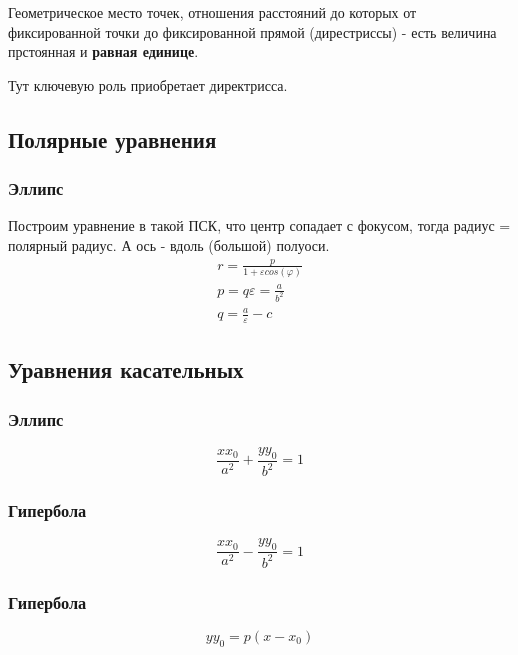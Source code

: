 \documentclass[12pt, a4paper]{article}
\begin{document}
    \begin{definition}
        [Парабола]
        Геометрическое место точек, 
        отношения расстояний до которых от фиксированной точки 
        до фиксированной прямой (дирестриссы) - 
        есть величина прстоянная и \textbf{равная единице}.
    \end{definition}

    Тут ключевую роль приобретает директрисса.

    \subsection{Полярные уравнения}

    \subsubsection{Эллипс}
    Построим уравнение в такой ПСК, что центр сопадает с фокусом, тогда радиус = полярный радиус.
    А ось - вдоль (большой) полуоси.
    \begin{gather}
        r = \frac{p}{1 + \varepsilon cos(\varphi)} \\
        p = q\varepsilon = \frac{a}{b^2} \\
        q = \frac{a}{\varepsilon} - c
    \end{gather}

    \subsection{Уравнения касательных}

    \subsubsection{Эллипс}
    \begin{equation}
        \frac{xx_0}{a^2} + \frac{yy_0}{b^2} = 1
    \end{equation}

    \subsubsection{Гипербола}
    \begin{equation}
        \frac{xx_0}{a^2} - \frac{yy_0}{b^2} = 1
    \end{equation}

    \subsubsection{Гипербола}
    \begin{equation}
        yy_0 = p (x - x_0)
    \end{equation}
\end{document}
